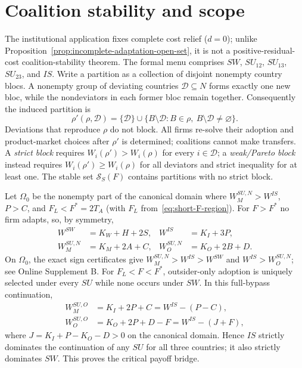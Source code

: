 \section{Coalition stability and scope}\label{sec:short-stability}
The institutional application fixes complete cost relief ($d=0$); unlike
Proposition~\ref{prop:incomplete-adaptation-open-set}, it is not a
positive-residual-cost coalition-stability theorem. The formal menu comprises
$SW$, $SU_{12}$, $SU_{13}$, $SU_{23}$, and $IS$. Write a partition as a
collection of disjoint nonempty country blocs. A nonempty group of deviating
countries $\mathcal D\subseteq N$ forms exactly one new bloc, while the
nondeviators in each former bloc remain together. Consequently the induced
partition is
\begin{equation}\label{eq:short-deviation-rule}
\rho'(\rho,\mathcal D)
=\{\mathcal D\}\cup
\bigl\{B\setminus\mathcal D:B\in\rho,\ B\setminus\mathcal D\ne\varnothing\bigr\}.
\end{equation}
Deviations that reproduce $\rho$ do not block. All firms re-solve their adoption
and product-market choices after $\rho'$ is determined; coalitions cannot make
transfers. A \emph{strict block} requires
$W_i(\rho')>W_i(\rho)$ for every $i\in\mathcal D$; a
\emph{weak/Pareto block} instead requires $W_i(\rho')\ge W_i(\rho)$ for
all deviators and strict inequality for at least one. The stable set
$\mathcal S_S(F)$ contains partitions with no strict block.

Let $\Omega_0$ be the nonempty part of the canonical domain where
$W_M^{SU,N}>W^{IS}$, $P>C$, and
$F_L<F^*=2T_A$ (with $F_L$ from~\eqref{eq:short-F-region}).
For $F>F^*$ no firm adapts, so, by symmetry,
\begin{align}\label{eq:short-institution-welfare}
W^{SW}&=K_W+H+2S,& W^{IS}&=K_I+3P,\nonumber\\
W_M^{SU,N}&=K_M+2A+C,&W_O^{SU,N}&=K_O+2B+D.
\end{align}
On $\Omega_0$, the exact sign certificates give
$W_M^{SU,N}>W^{IS}>W^{SW}$ and
$W^{IS}>W_O^{SU,N}$; see Online Supplement B.
For $F_L<F<F^*$, outsider-only adoption is uniquely selected under every
$SU$ while none occurs under $SW$. In this full-bypass continuation,
\begin{align}\label{eq:short-IS-dominates-SU}
W_M^{SU,O}&=K_I+2P+C=W^{IS}-(P-C),\nonumber\\
W_O^{SU,O}&=K_O+2P+D-F=W^{IS}-(J+F),
\end{align}
where $J=K_I+P-K_O-D>0$ on the canonical domain. Hence $IS$
strictly dominates the continuation of any $SU$ for all three countries;
it also strictly dominates $SW$. This proves the critical payoff bridge.

